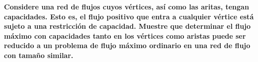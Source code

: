 \textbf{
    Considere una red de flujos cuyos vértices, así como las aritas, tengan capacidades.
    Esto es, el flujo positivo que entra a cualquier vértice está sujeto a una restricción
    de capacidad. Muestre que determinar el flujo máximo con capacidades tanto en los vértices
    como aristas puede ser reducido a un problema de flujo máximo ordinario en una red de 
    flujo con tamaño similar.
}\vspace{.2cm}
\textcolor{bibi}{}
\begin{quote}
\end{quote}